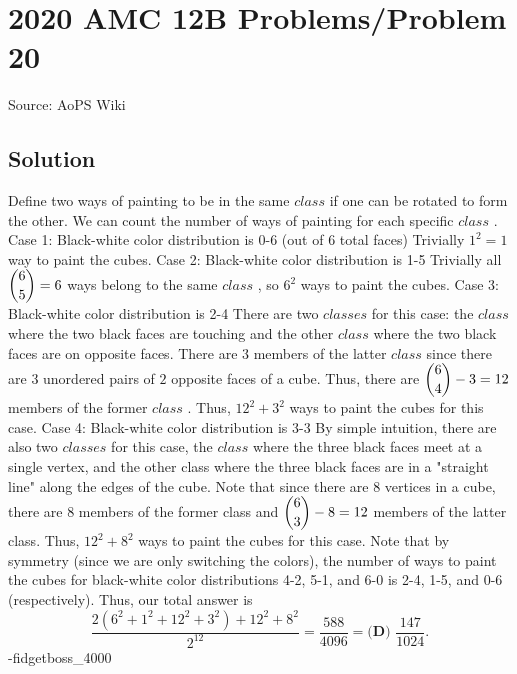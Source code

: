 \documentclass[12pt]{article}
\begin{document}
\section*{{2020 AMC 12B Problems/Problem 20}}
Source: AoPS Wiki

\subsection*{Solution}
Define two ways of painting to be in the same $class$ if one can be rotated to form the other. We can count the number of ways of painting for each specific $class$ . Case 1: Black-white color distribution is 0-6 (out of 6 total faces) Trivially $1^2 = 1$ way to paint the cubes. Case 2: Black-white color distribution is 1-5 Trivially all $\dbinom{6}{5} = 6$ ways belong to the same $class$ , so $6^2$ ways to paint the cubes. Case 3: Black-white color distribution is 2-4 There are two $classes$ for this case: the $class$ where the two black faces are touching and the other $class$ where the two black faces are on opposite faces. There are $3$ members of the latter $class$ since there are $3$ unordered pairs of $2$ opposite faces of a cube. Thus, there are $\dbinom{6}{4} - 3 = 12$ members of the former $class$ . Thus, $12^2 + 3^2$ ways to paint the cubes for this case. Case 4: Black-white color distribution is 3-3 By simple intuition, there are also two $classes$ for this case, the $class$ where the three black faces meet at a single vertex, and the other class where the three black faces are in a "straight line" along the edges of the cube. Note that since there are $8$ vertices in a cube, there are $8$ members of the former class and $\dbinom{6}{3} - 8 = 12$ members of the latter class. Thus, $12^2 + 8^2$ ways to paint the cubes for this case. Note that by symmetry (since we are only switching the colors), the number of ways to paint the cubes for black-white color distributions 4-2, 5-1, and 6-0 is 2-4, 1-5, and 0-6 (respectively). Thus, our total answer is \[\frac{2(6^2 + 1^2 + 12^2 + 3^2) + 12^2 + 8^2}{2^{12}} = \frac{588}{4096} = \boxed{\textbf{(D) } \frac{147}{1024}}.\] -fidgetboss_4000
\end{document}
